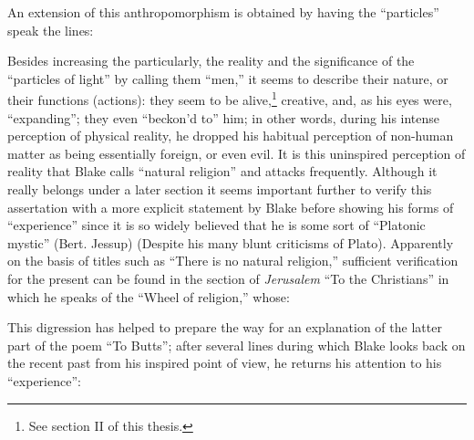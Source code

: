 An extension of this anthropomorphism is obtained by having the \enquote{particles}
speak the lines:


Besides increasing the particularly, the reality and the significance of the \enquote{particles of light}
by calling them \enquote{men,} it seems to describe their nature, or their functions (actions):
they seem to be alive,\footnote{See section II of this thesis.}
creative, and, as his eyes were, \enquote{expanding}; they even
\enquote{beckon'd to} him; in other words, during his intense perception of physical reality, he dropped
his habitual perception of non-human matter as being essentially foreign, or even evil. It is this uninspired
perception of reality that Blake calls \enquote{natural religion} and attacks frequently.
Although it really belongs under a later section it seems important further to verify this
assertation with a more explicit statement by Blake before showing his forms of \enquote{experience} since it
is so widely believed that he is some sort of \enquote{Platonic mystic} (Bert. Jessup) (Despite his many blunt
criticisms of Plato). Apparently on the basis of titles such as \enquote{There is no
natural religion,} sufficient verification for the present can be found in the section of \emph{Jerusalem}
\enquote{To the Christians} in which he speaks of the \enquote{Wheel of religion,} whose:

\label{self:20}


This digression has helped to prepare the way for an explanation of the latter
part of the poem \enquote{To Butts}; after several lines during which Blake looks back on the
recent past from his inspired point of view, he returns his attention to his \enquote{experience}:

